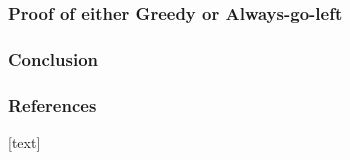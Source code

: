 \documentclass[serif,professionalfonts]{beamer}
\newcommand\scalefac{0.55}
\newcommand\ballsize{5mm}
\newcommand\nrbins{6}
\newcommand\padding{0.1*\ballsize}
\newcommand\bingap{1.6*\balldiameter}
\newcommand\balldiameter{2*\ballsize}
\newcommand\bin[1]{
	\path node[topflat, xshift=#1*\bingap*\scalefac, above, yshift=-\padding*\scalefac]  {};
}
\newcommand\bins{
	\foreach \ibin in {1,...,\nrbins}
		\bin{\ibin};
}
\newcommand\ball[2]{
	\draw let \n1 ={#1#2} in node[circle, minimum size = \ballsize](n\n1) at (#1*\bingap,#2*\balldiameter-\ballsize) {};
	\shade[ballstyle] (#1*\bingap,#2*\balldiameter-\ballsize) circle (\ballsize) {};
}
\newcommand\putinbin[2]{
	\ifnum #2 > 0
		\foreach \nrballs in {1,...,#2}
 			\ball{#1}{\nrballs};
 	\fi
}
\newcounter{index}
\newcommand\balls[1]{%
	\getargsC{#1}%
  	\setcounter{index}{0}%
  	\whiledo{\theindex < \narg}{%
    		\stepcounter{index}%
    		\putinbin{\theindex}{\csname arg\romannumeral\theindex\endcsname}%
  	}%
}
\newcommand\bab[1]{%
	\bins
	\balls{#1}
}
\begin{document}
\begin{frame}
\frametitle{Proof of either Greedy or Always-go-left}
\end{frame}

\begin{frame}
\frametitle{Conclusion}
\end{frame}

\begin{comment}
\section{Test}
\begin{frame}
\frametitle{Ignore the following}
\begin{tikzpicture}[scale=\scalefac]
	\bab{1 2 3 4 5 6}
\end{tikzpicture}
\end{frame}
\end{comment}


\begin{frame}[allowframebreaks, label=references]
\frametitle<presentation>{References}    

\nocite{*}
[text]

\end{frame} 	
\end{document}
